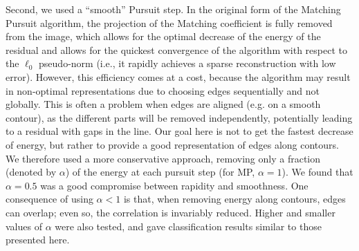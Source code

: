 \documentclass[a4paper]{article}
\begin{document}
Second, we used a ``smooth'' Pursuit step. 
In the original form of the Matching Pursuit algorithm, 
the projection of the Matching coefficient is fully removed from the image, 
which allows for the optimal decrease of the energy of the residual 
and allows for the quickest convergence of the algorithm 
with respect to the $\ell_0$ pseudo-norm 
(i.e., it rapidly achieves a sparse reconstruction with low error). 
However, this efficiency comes at a cost, 
because the algorithm may result in non-optimal representations 
due to choosing edges sequentially and not globally. 
This is often a problem when edges are aligned (e.g. on a smooth contour), 
as the different parts will be removed independently, potentially leading 
to a residual with gaps in the line. 
Our goal here is not to get the fastest decrease of energy, 
but rather to provide a good representation of edges along contours. 
We therefore used a more conservative approach, 
removing only a fraction (denoted by $\alpha$) 
of the energy at each pursuit step (for MP, $\alpha=1$). 
We found that $\alpha=0.5$ was a good compromise between rapidity and smoothness. 
One consequence of using $\alpha<1$ is that, when removing energy along contours, 
edges can overlap; even so, the correlation is invariably reduced. 
Higher and smaller values of $\alpha$ were also tested, 
and gave classification results similar to those presented here.
\end{document}
